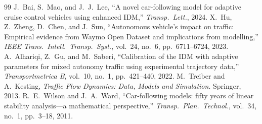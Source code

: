 \documentclass[11pt]{article}
\begin{document}
\begin{thebibliography}{99}
 J.\ Bai, S.\ Mao, and J.\ J.\ Lee, ``A novel car-following
model for adaptive cruise control vehicles using enhanced IDM,'' \emph{Transp.\
Lett.}, 2024.
 X.\ Hu, Z.\ Zheng, D.\ Chen, and J.\ Sun, ``Autonomous vehicle's
impact on traffic: Empirical evidence from Waymo Open Dataset and implications
from modelling,'' \emph{IEEE Trans.\ Intell.\ Transp.\ Syst.}, vol.\ 24, no.\ 6,
pp.\ 6711--6724, 2023.
 A.\ Alhariqi, Z.\ Gu, and M.\ Saberi, ``Calibration of the
IDM with adaptive parameters for mixed autonomy traffic using experimental
trajectory data,'' \emph{Transportmetrica B}, vol.\ 10, no.\ 1, pp.\ 421--440, 2022.
\bibitem{treiber2013} M.\ Treiber and A.\ Kesting, \emph{Traffic Flow Dynamics:
Data, Models and Simulation}. Springer, 2013.
 R.\ E.\ Wilson and J.\ A.\ Ward, ``Car-following models:
fifty years of linear stability analysis---a mathematical perspective,''
\emph{Transp.\ Plan.\ Technol.}, vol.\ 34, no.\ 1, pp.\ 3--18, 2011.
\end{thebibliography}
\end{document}
